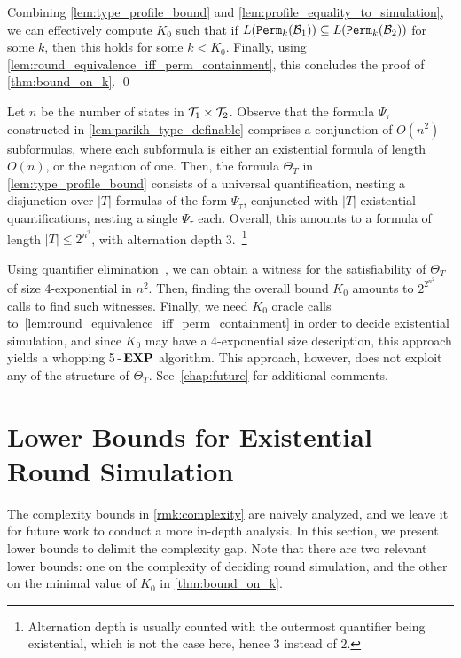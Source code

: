 Combining \autoref{lem:type_profile_bound} and \autoref{lem:profile_equality_to_simulation}, we can effectively compute $K_0$ such that if
$L({\mathtt{Perm}}_{k}(\mathcal{B}_1))\subseteq L({\mathtt{Perm}}_{k}(\mathcal{B}_2))$
for some $k$, then this holds for some $k<K_0$. Finally, using \autoref{lem:round_equivalence_iff_perm_containment}, this concludes the proof of \autoref{thm:bound_on_k}. \qed

\begin{remark}
\label{rmk:complexity}
Let $n$ be the number of states in $\mathcal{T}_1\times \mathcal{T}_2$. Observe that the formula $\Psi_\tau$ constructed in \autoref{lem:parikh_type_definable} comprises a conjunction of $O(n^2)$ \PA subformulas, where each subformula is either an existential \PA formula of length $O(n)$, or the negation of one. Then, the formula $\Theta_T$ in \autoref{lem:type_profile_bound} consists of a universal quantification, nesting a disjunction over $|T|$ formulas of the form $\Psi_\tau$, conjuncted with $|T|$ existential quantifications, nesting a single $\Psi_\tau$ each.
Overall, this amounts to a formula of length $|T|\le 2^{n^2}$, with alternation depth 3.~\footnote{Alternation depth is usually counted with the outermost quantifier being existential, which is not the case here, hence $3$ instead of $2$.}

Using quantifier elimination~\cite{Cooper1972,Oppen1978}, we can obtain a witness for the satisfiability of $\Theta_T$ of size 4-exponential in $n^2$. Then, finding the overall bound $K_0$ amounts to $2^{2^{n^2}}$ calls to find such witnesses. Finally, we need $K_0$ oracle calls to~\autoref{lem:round_equivalence_iff_perm_containment} in order to decide existential simulation, and since $K_0$ may have a 4-exponential size description, this approach yields a whopping 5\,-\,$\textbf{EXP}$ algorithm. 
This approach, however, does not exploit any of the structure of $\Theta_T$. See~\autoref{chap:future} for additional comments.
\end{remark}

\section{Lower Bounds for Existential Round Simulation}
\label{sec:lower_bounds_existential}
The complexity bounds in \autoref{rmk:complexity} are naively analyzed, and we leave it for future work to conduct a more in-depth analysis. In this section, we present lower bounds to delimit the complexity gap. Note that there are two relevant lower bounds: one on the complexity of deciding round simulation, and the other on the minimal value of $K_0$ in \autoref{thm:bound_on_k}.

